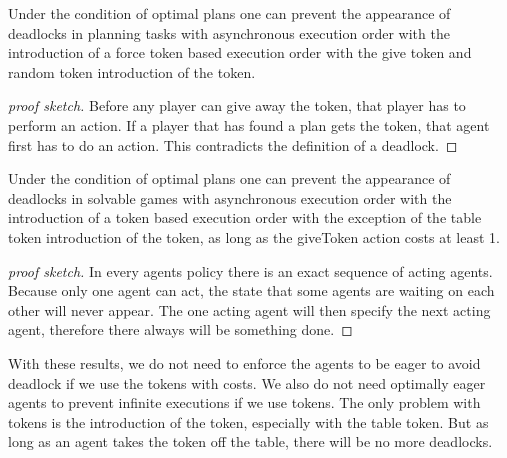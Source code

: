 \begin{theorem}
Under the condition of optimal plans one can prevent the appearance of deadlocks in planning tasks with asynchronous execution order with the introduction of a force token based execution order with the give token and random token introduction of the token.
\end{theorem}

\begin{proof}[proof sketch]
  Before any player can give away the token, that player has to perform an action. If a player that has found a plan gets the token, that agent first has to do an action. This contradicts the definition of a deadlock.
\end{proof}


\begin{theorem}
  Under the condition of optimal plans one can prevent the appearance of deadlocks in solvable games with asynchronous execution order with the introduction of a token based execution order with the exception of the table token introduction of the token, as long as the giveToken action costs at least 1.
\end{theorem}

\begin{proof}[proof sketch]
  In every agents policy there is an exact sequence of acting agents. Because only one agent can act, the state that some agents are waiting on each other will never appear.
  The one acting agent will then specify the next acting agent, therefore there always will be something done.
\end{proof}


With these results, we do not need to enforce the agents to be eager to avoid deadlock if we use the tokens with costs. We also do not need optimally eager agents to prevent infinite executions if we use tokens. The only problem with tokens is the introduction of the token, especially with the table token. But as long as an agent takes the token off the table, there will be no more deadlocks.
